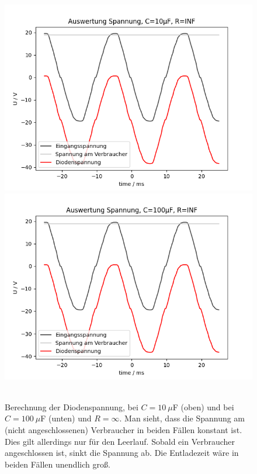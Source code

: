 \documentclass{article}
\begin{document}
\begin{figure}[H]
\caption{Berechnung der Diodenspannung, bei $C = 10~\mu$F (oben) und bei $C = 100~\mu$F (unten) und $R = \infty$. Man sieht, dass die Spannung am (nicht angeschlossenen) Verbraucher in beiden Fällen konstant ist. Dies gilt allerdings nur für den Leerlauf. Sobald ein Verbraucher angeschlossen ist, sinkt die Spannung ab. Die Entladezeit wäre in beiden Fällen unendlich groß.}
\label{fig:grafik_task3_auswertung_10_inf}
{\centering
\includegraphics[scale=0.6]{bilder/task3_auswertung_10mu_Rinf.png}
\includegraphics[scale=0.6]{bilder/task3_auswertung_100mu_Rinf.png}
~
}
\end{figure}


\newpage
\end{document}
